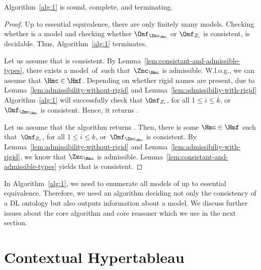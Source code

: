 \begin{lemma}\label{lem:alg1-sound-complete-terminating}
  Algorithm~\ref{alg:1} is sound, complete, and terminating.
\end{lemma}
\begin{proof}
  Up to essential equivalence, there are only finitely many models. Checking whether \Hmc is a model and checking whether
  $\Omf_{\Zmc_{\Hmc}}$ or $\Omf_{Z_{i}}$ is consistent, is decidable. Thus, Algorithm~\ref{alg:1}
  terminates.

  Let us assume that \Bmf is consistent. By Lemma~\ref{lem:consistant-and-admissible-types}, there
  exists a model~\Hmc of~\Bmfb such that~$\Zmc_{\Hmc}$ is admissible. W.l.o.g., we can assume that
  $\Hmc\in\Hmf$. 
  Depending on whether rigid names are present, due to
  Lemma~\ref{lem:admissibility-without-rigid} and Lemma~\ref{lem:admissibiliy-with-rigid} Algorithm~\ref{alg:1} will successfully check that
  $\Omf_{Z_{i}}$, for all $1\leq i \leq k$, or $\Omf_{\Zmc_{\Hmc}}$ is consistent. Hence, it
  returns \true.

  Let us assume that the algorithm returns \true. Then, there is some $\Hmc\in\Hmf$ such that~$\Omf_{Z_{i}}$,
  for all $1\leq i \leq k$, or~$\Omf_{\Zmc_{\Hmc}}$ is consistent. By
  Lemma~\ref{lem:admissibility-without-rigid} and Lemma~\ref{lem:admissibiliy-with-rigid}, we know
  that $\Zmc_{\Hmc}$ is admissible. Lemma~\ref{lem:consistant-and-admissible-types} yields that \Bmf
  is consistent.
\end{proof}

In Algorithm~\ref{alg:1}, we need to enumerate all models of \Bmfb up to essential
equivalence. Therefore, we need an algorithm deciding not only the consistency of a DL ontology but also
outputs information about a model. We discuss further issues about the core algorithm and core
reasoner which we use in the next section.


\section{Contextual Hypertableau}
\label{sec:using-hypertableau}

